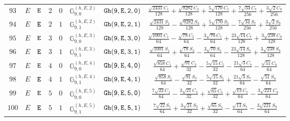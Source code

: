 \documentclass[fleqn,8pt]{jsarticle}
\begin{document}
\begin{table}[ht!]
\begin{center}
\begin{tabular}{cccccccc}
$ 93 $ & $ E $ & $ {\tt E} $ & $ 2 $ & $ 0 $ & $ \mathbb{G}_{9,0}^{(h,E,2)} $ & $ {\tt Gh(9,E,2,0)} $ & $ \frac{\sqrt{2431} C_{1}}{128} + \frac{\sqrt{9282} C_{3}}{128} + \frac{5 \sqrt{170} C_{5}}{128} + \frac{7 \sqrt{34} C_{7}}{256} + \frac{3 \sqrt{2} C_{9}}{256} $ \\
$ 94 $ & $ E $ & $ {\tt E} $ & $ 2 $ & $ 1 $ & $ \mathbb{G}_{9,1}^{(h,E,2)} $ & $ {\tt Gh(9,E,2,1)} $ & $ \frac{\sqrt{2431} S_{1}}{128} - \frac{\sqrt{9282} S_{3}}{128} + \frac{5 \sqrt{170} S_{5}}{128} - \frac{7 \sqrt{34} S_{7}}{256} + \frac{3 \sqrt{2} S_{9}}{256} $ \\
$ 95 $ & $ E $ & $ {\tt E} $ & $ 3 $ & $ 0 $ & $ \mathbb{G}_{9,0}^{(h,E,3)} $ & $ {\tt Gh(9,E,3,0)} $ & $ \frac{\sqrt{1001} C_{1}}{64} - \frac{\sqrt{78} C_{3}}{64} - \frac{3 \sqrt{70} C_{5}}{64} + \frac{23 \sqrt{14} C_{7}}{128} + \frac{3 \sqrt{238} C_{9}}{128} $ \\
$ 96 $ & $ E $ & $ {\tt E} $ & $ 3 $ & $ 1 $ & $ \mathbb{G}_{9,1}^{(h,E,3)} $ & $ {\tt Gh(9,E,3,1)} $ & $ \frac{\sqrt{1001} S_{1}}{64} + \frac{\sqrt{78} S_{3}}{64} - \frac{3 \sqrt{70} S_{5}}{64} - \frac{23 \sqrt{14} S_{7}}{128} + \frac{3 \sqrt{238} S_{9}}{128} $ \\
$ 97 $ & $ E $ & $ {\tt E} $ & $ 4 $ & $ 0 $ & $ \mathbb{G}_{9,0}^{(h,E,4)} $ & $ {\tt Gh(9,E,4,0)} $ & $ \frac{\sqrt{858} C_{1}}{64} + \frac{\sqrt{91} C_{3}}{32} - \frac{5 \sqrt{15} C_{5}}{32} - \frac{21 \sqrt{3} C_{7}}{64} - \frac{\sqrt{51} C_{9}}{64} $ \\
$ 98 $ & $ E $ & $ {\tt E} $ & $ 4 $ & $ 1 $ & $ \mathbb{G}_{9,1}^{(h,E,4)} $ & $ {\tt Gh(9,E,4,1)} $ & $ \frac{\sqrt{858} S_{1}}{64} - \frac{\sqrt{91} S_{3}}{32} - \frac{5 \sqrt{15} S_{5}}{32} + \frac{21 \sqrt{3} S_{7}}{64} - \frac{\sqrt{51} S_{9}}{64} $ \\
$ 99 $ & $ E $ & $ {\tt E} $ & $ 5 $ & $ 0 $ & $ \mathbb{G}_{9,0}^{(h,E,5)} $ & $ {\tt Gh(9,E,5,0)} $ & $ \frac{7 \sqrt{22} C_{1}}{64} - \frac{3 \sqrt{21} C_{3}}{32} + \frac{\sqrt{65} C_{5}}{32} + \frac{\sqrt{13} C_{7}}{64} - \frac{3 \sqrt{221} C_{9}}{64} $ \\
$ 100 $ & $ E $ & $ {\tt E} $ & $ 5 $ & $ 1 $ & $ \mathbb{G}_{9,1}^{(h,E,5)} $ & $ {\tt Gh(9,E,5,1)} $ & $ \frac{7 \sqrt{22} S_{1}}{64} + \frac{3 \sqrt{21} S_{3}}{32} + \frac{\sqrt{65} S_{5}}{32} - \frac{\sqrt{13} S_{7}}{64} - \frac{3 \sqrt{221} S_{9}}{64} $ \\
 \hline \hline
\end{tabular}
\end{center}
\end{table}
\end{document}
